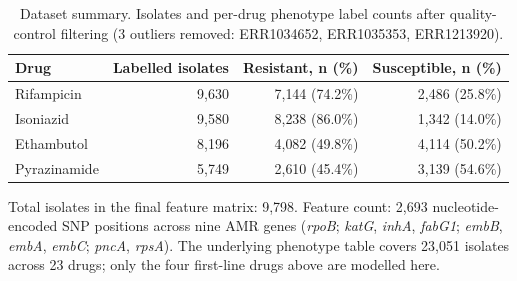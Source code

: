 \begin{table}[t]
\centering
\caption{Dataset summary. Isolates and per-drug phenotype label counts after quality-control filtering (3 outliers removed: ERR1034652, ERR1035353, ERR1213920).}
\label{tab:dataset}
\small
\begin{tabular}{lrrr}
\toprule
Drug & Labelled isolates & Resistant, n (\%) & Susceptible, n (\%) \\
\midrule
Rifampicin   & 9{,}630 & 7{,}144 (74.2\%) & 2{,}486 (25.8\%) \\
Isoniazid    & 9{,}580 & 8{,}238 (86.0\%) & 1{,}342 (14.0\%) \\
Ethambutol   & 8{,}196 & 4{,}082 (49.8\%) & 4{,}114 (50.2\%) \\
Pyrazinamide & 5{,}749 & 2{,}610 (45.4\%) & 3{,}139 (54.6\%) \\
\bottomrule
\end{tabular}

\vspace{4pt}
\footnotesize
Total isolates in the final feature matrix: 9{,}798. Feature count: 2{,}693 nucleotide-encoded SNP positions across nine AMR genes (\emph{rpoB}; \emph{katG}, \emph{inhA}, \emph{fabG1}; \emph{embB}, \emph{embA}, \emph{embC}; \emph{pncA}, \emph{rpsA}). The underlying phenotype table covers 23{,}051 isolates across 23 drugs; only the four first-line drugs above are modelled here.
\end{table}
